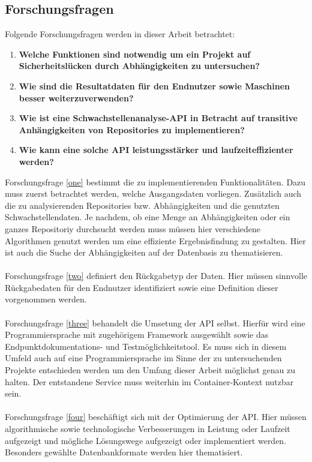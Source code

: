 \subsection{Forschungsfragen} \label{sec:Forschungsfragen}
Folgende Forschungsfragen werden in dieser Arbeit betrachtet:
\begin{enumerate}
    \item \textbf{Welche Funktionen sind notwendig um ein Projekt auf Sicherheitslücken durch Abhängigkeiten zu untersuchen?} \label{one}
    \item \textbf{Wie sind die Resultatdaten für den Endnutzer sowie Maschinen besser weiterzuverwenden?} \label{two}
    \item \textbf{Wie ist eine Schwachstellenanalyse-API in Betracht auf transitive Anhängigkeiten von Repositories zu implementieren?} \label{three}
    \item \textbf{Wie kann eine solche API leistungsstärker und laufzeiteffizienter werden?} \label{four}
\end{enumerate}
Forschungsfrage \ref{one} bestimmt die zu implementierenden Funktionalitäten.
Dazu muss zuerst betrachtet werden, welche Ausgangsdaten vorliegen.
Zusätzlich auch die zu analysierenden Repositories bzw. Abhängigkeiten und die genutzten Schwachstellendaten.
Je nachdem, ob eine Menge an Abhängigkeiten oder ein ganzes Repositoriy durchsucht werden muss müssen hier verschiedene Algorithmen genutzt werden um eine effiziente Ergebnisfindung zu gestalten.
Hier ist auch die Suche der Abhängigkeiten auf der Datenbasis zu thematisieren. 
\\ \\
Forschungsfrage \ref{two} definiert den Rückgabetyp der Daten.
Hier müssen sinnvolle Rückgabedaten für den Endnutzer identifiziert sowie eine Definition dieser vorgenommen werden.
\\ \\
Forschungsfrage \ref{three} behandelt die Umsetung der API selbst.
Hierfür wird eine Programmiersprache mit zugehörigem Framework ausgewählt sowie das Endpunktdokumentations- und Testmöglichkeitstool.
Es muss sich in diesem Umfeld auch auf eine Programmiersprache im Sinne der zu untersuchenden Projekte entschieden werden um den Umfang dieser Arbeit möglichst genau zu halten.
Der entstandene Service muss weiterhin im Container-Kontext nutzbar sein.
\\ \\
Forschungsfrage \ref{four} beschäftigt sich mit der Optimierung der API.
Hier müssen algorithmische sowie technologische Verbesserungen in Leistung oder Laufzeit aufgezeigt und mögliche Lösungswege aufgezeigt oder implementiert werden.
Besonders gewählte Datenbankformate werden hier thematisiert.